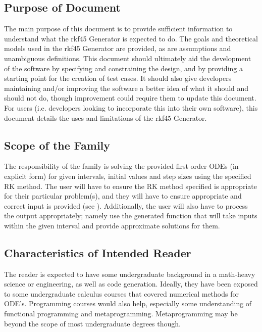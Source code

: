 \documentclass[12pt]{article}
\newcommand{\famname}{rkf45 Generator} %
\begin{document}
\subsection{Purpose of Document}
The main purpose of this document is to provide sufficient information to 
understand what the \famname{} is expected to do.
The goals and theoretical models used in the \famname{} are provided, as are 
assumptions and unambiguous definitions.
This document should ultimately aid the development of the software by 
specifying and constraining the design, and by providing a starting point for 
the creation of test cases.
It should also give developers maintaining and/or improving the software a 
better idea of what it should and should not do, though improvement could 
require them to update this document.
For users (i.e. developers looking to incorporate this into their own 
software), this document details the uses and limitations of the \famname{}.

\subsection{Scope of the Family}
The responsibility of the family is solving the provided first order ODEs (in 
explicit form) for given intervals, initial values and step sizes using the 
specified RK method. The 
user will have to ensure the RK method specified is appropriate for their 
particular problem(s), and they will have to ensure appropriate and correct 
input is provided (see ). 
Additionally, the user will also have to process the output appropriately; 
namely use the generated function that will take inputs within the given 
interval and provide approximate solutions for them.

\subsection{Characteristics of Intended Reader} 
The reader is expected to have some undergraduate background in a math-heavy 
science or engineering, as well as code generation. Ideally, they have been 
exposed to some undergraduate calculus courses that covered numerical methods 
for ODE's.
Programming courses would also help, especially some understanding of 
functional programming and metaprogramming. 
Metaprogramming may be beyond the scope of most undergraduate degrees though.
\end{document}
